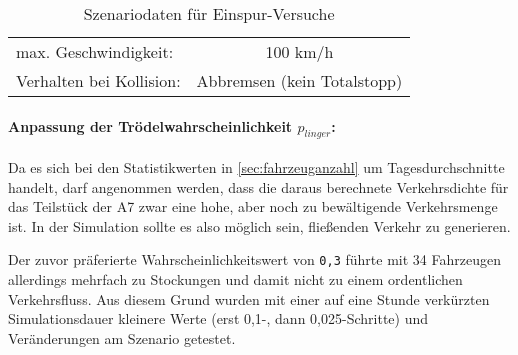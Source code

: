 \begin{table}[hptb]
\begin{center}
{\begin{tabular}{ l  c }
\hspace{1em}max. Geschwindigkeit:\hspace{1em} & \hspace{1em}100 km/h\hspace{1em} \\
\hspace{1em}Verhalten bei Kollision:\hspace{1em} & \hspace{1em}Abbremsen (kein Totalstopp)\hspace{1em} \\
\hline 
\end{tabular}
}
\caption{Szenariodaten für Einspur-Versuche}
\label{tab:szenario-singlelane}
\end{center}
\end{table}


\paragraph*{Anpassung der Trödelwahrscheinlichkeit $p_{linger}$:} 
\label{sec:adjust-linger}
Da es sich bei den Statistikwerten in \cref{sec:fahrzeuganzahl} um Tagesdurchschnitte handelt, darf angenommen werden, dass die daraus berechnete Verkehrsdichte für das Teilstück der A7 zwar eine hohe, aber noch zu bewältigende Verkehrsmenge ist.
In der Simulation sollte es also möglich sein, fließenden Verkehr zu generieren.

Der zuvor präferierte Wahrscheinlichkeitswert von \texttt{0,3} führte mit 34 Fahrzeugen allerdings mehrfach zu Stockungen und damit nicht zu einem ordentlichen Verkehrsfluss.
Aus diesem Grund wurden mit einer auf eine Stunde verkürzten Simulationsdauer kleinere Werte (erst 0,1-, dann 0,025-Schritte) und Veränderungen am Szenario getestet.

